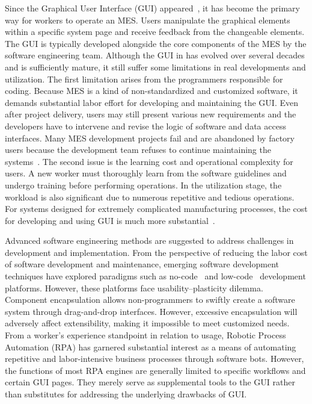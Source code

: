 \documentclass[preprint,12pt]{elsarticle}
\begin{document}
Since the Graphical User Interface (GUI) appeared~\cite {martinez2011graphical}, 
it has become the primary way for workers to operate an MES.
Users manipulate the graphical elements within a specific system page and receive feedback from the changeable elements.
The GUI is typically developed alongside the core components of the MES by the software engineering team.
Although the GUI in has evolved over several decades and is sufficiently mature, it still suffer some limitations in real developments and utilization.
The first limitation arises from the programmers responsible for coding.
Because MES is a kind of non-standardized and customized software, it demands substantial labor effort for developing and maintaining the GUI.
Even after project delivery, users may still present various new requirements and the developers have to intervene and revise the logic of software and data access interfaces.
Many MES development projects fail and are abandoned by factory users because the development team refuses to continue maintaining the systems~\cite{pr10112173}.
The second issue is the learning cost and operational complexity for users.
A new worker must thoroughly learn from the software guidelines and undergo training before performing operations.
In the utilization stage, the workload is also significant due to numerous repetitive and tedious operations.
For systems designed for extremely complicated manufacturing processes, the cost for developing and using GUI is much more substantial~\cite{li2022application}.

Advanced software engineering methods are suggested to address challenges in development and implementation. 
From the perspective of reducing the labor cost of software development and maintenance,
emerging software development techniques have explored paradigms such as no-code~\cite{rokis2022challenges} and low-code~\cite{cabot2020positioning} development platforms.
However, these platforms face usability--plasticity dilemma.
Component encapsulation allows non-programmers to swiftly create a software system through drag-and-drop interfaces.
However, excessive encapsulation will adversely affect extensibility, making it impossible to meet customized needs.
From a worker's experience standpoint in relation to usage, Robotic Process Automation (RPA)\cite{siderska2020robotic} has garnered substantial interest as a means of automating repetitive and labor-intensive business processes through software bots.
However, the functions of most RPA engines are generally limited to specific workflows and certain GUI pages.
They merely serve as supplemental tools to the GUI rather than substitutes for addressing the underlying drawbacks of GUI.
\end{document}
